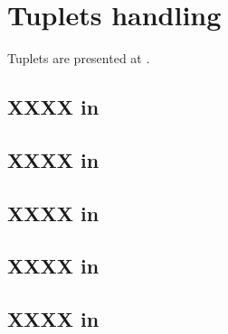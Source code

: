 



\chapter{Tuplets handling}\label{Tuplets handling}

Tuplets are presented at .


\section{XXXX in \mxsrToMsr{}}


\section{XXXX in \mxsrToMsr{}}


\section{XXXX in \msrToMsr{}}


\section{XXXX in \msrToLpsr{}}


\section{XXXX in \lpsrToLilypond{}}


